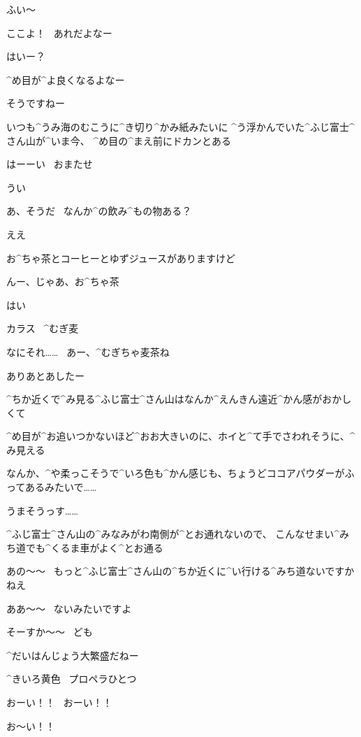 \Person ふい〜

\Person ここよ！
\ あれだよなー

\Alpha はいー？

\page[106]
\Person ^{め}{目}が^{よ}{良}くなるよなー

\Alpha そうですねー

\page[108]
\Alpha いつも^{うみ}{海}のむこうに^{き}{切}り^{かみ}{紙}みたいに
^{う}{浮}かんでいた^{ふじ}{富士}^{さん}{山}が^{いま}{今}、
^{め}{目}の^{まえ}{前}にドカンとある

\Alpha はーーい
\ おまたせ

\Person うい

\Person あ、そうだ
\ なんか^{の}{飲}み^{もの}{物}ある？

\Alpha ええ

\page[109]
\Alpha お^{ちゃ}{茶}とコーヒーとゆずジュースがありますけど

\Person んー、じゃあ、お^{ちゃ}{茶}

\Alpha はい

\Sign カラス
\ ^{むぎ}{麦}

\Person なにそれ……
\ あー、^{むぎちゃ}{麦茶}ね

\Alpha ありあとあしたー

\page[110]
\Alpha ^{ちか}{近}くで^{み}{見}る^{ふじ}{富士}^{さん}{山}はなんか^{えんきん}{遠近}^{かん}{感}がおかしくて

\Alpha ^{め}{目}が^{お}{追}いつかないほど^{おお}{大}きいのに、ホイと^{て}{手}でさわれそうに、^{み}{見}える

\Alpha なんか、^{や}{柔}っこそうで^{いろ}{色}も^{かん}{感}じも、ちょうどココアパウダーがふってあるみたいで……

\Alpha うまそうっす……

\page[111]
\Alpha ^{ふじ}{富士}^{さん}{山}の^{みなみがわ}{南側}が^{とお}{通}れないので、
こんなせまい^{みち}{道}でも^{くるま}{車}がよく^{とお}{通}る

\Person あの〜〜
\ もっと^{ふじ}{富士}^{さん}{山}の^{ちか}{近}くに^{い}{行}ける^{みち}{道}ないですかねえ

\Alpha ああ〜〜
\ ないみたいですよ

\Person そーすか〜〜
\ ども

\Alpha ^{だいはんじょう}{大繁盛}だねー

\page[113]
\Alpha ^{きいろ}{黄色}
\ プロペラひとつ

\Alpha おーい！！
\ おーい！！

\page[114]
\Alpha お〜い！！

